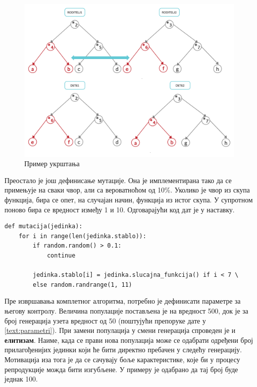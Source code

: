 \documentclass[a4paper]{article}
\begin{document}
\begin{figure}[ht!]
    \begin{center}
        \includegraphics[scale=0.16]{ukrstanje.png}
    \end{center}
    \caption{Пример укрштања}
    \label{fig:ukrstanje}
\end{figure}

Преостало је још дефинисање мутације. Она је имплементирана тако да се примењује на сваки чвор, али са вероватноћом од 10\%.
Уколико је чвор из скупа функција, бира се опет, на случајан начин, функција из истог скупа. У супротном поново бира се вредност између 1 и 10. Одговарајући код дат је у наставку.

\bigskip
\bigskip
\begin{lstlisting}[frame=single]
def mutacija(jedinka):
    for i in range(len(jedinka.stablo)):
        if random.random() > 0.1:
            continue

        jedinka.stablo[i] = jedinka.slucajna_funkcija() if i < 7 \
        else random.randrange(1, 11)
\end{lstlisting}

Пре извршавања комплетног алгоритма, потребно је дефинисати параметре за његову контролу. Величина популације постављена је на вредност 500, док је за број генерација узета вредност од 50 (поштујући препоруке дате у \ref{text:parametri}). При замени популација у смени генерација спроведен је и \textbf{елитизам}. Наиме, када се прави нова популација може се одабрати одређени број прилагођенијих јединки који ће бити директно пребачен у следећу генерацију. Мотивација иза тога је да се сачувају боље карактеристике, које би у процесу репродукције можда бити изгубљене. У примеру је одабрано да тај број буде једнак 100. \newline
\end{document}
